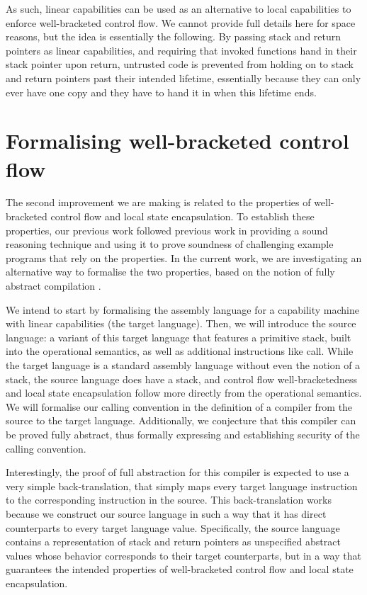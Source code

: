 \documentclass[sigplan,screen]{acmart}
\begin{document}
As such, linear capabilities can be used as an alternative to local capabilities to enforce well-bracketed control flow.
We cannot provide full details here for space reasons, but the idea is essentially the following.
By passing stack and return pointers as linear capabilities, and requiring that invoked functions hand in their stack pointer upon return, untrusted code is prevented from holding on to stack and return pointers past their intended lifetime, essentially because they can only ever have one copy and they have to hand it in when this lifetime ends.

\section{Formalising well-bracketed control flow}
The second improvement we are making is related to the properties of well-bracketed control flow and local state encapsulation.
To establish these properties, our previous work followed previous work \citep{dreyer_impact_2010} in providing a sound reasoning technique and using it to prove soundness of challenging example programs that rely on the properties.
In the current work, we are investigating an alternative way to formalise the two properties, based on the notion of fully abstract compilation \citep{abadi_protection_1999}.

We intend to start by formalising the assembly language for a capability machine with linear capabilities (the target language).
Then, we will introduce the source language: a variant of this target language that features a primitive stack, built into the operational semantics, as well as additional instructions like call.
While the target language is a standard assembly language without even the notion of a stack, the source language does have a stack, and control flow well-bracketedness and local state encapsulation follow more directly from the operational semantics.
We will formalise our calling convention in the definition of a compiler from the source to the target language.
Additionally, we conjecture that this compiler can be proved fully abstract, thus formally expressing and establishing security of the calling convention.

Interestingly, the proof of full abstraction for this compiler is expected to use a very simple back-translation, that simply maps every target language instruction to the corresponding instruction in the source.
This back-translation works because we construct our source language in such a way that it has direct counterparts to every target language value.
Specifically, the source language contains a representation of stack and return pointers as unspecified abstract values whose behavior corresponds to their target counterparts, but in a way that guarantees the intended properties of well-bracketed control flow and local state encapsulation.


 
\end{document}
